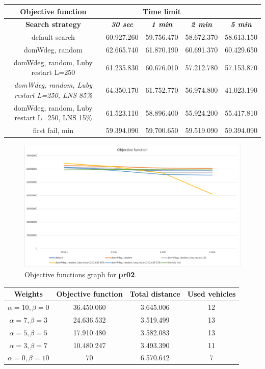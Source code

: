 {
\renewcommand{\arraystretch}{2}
\begin{longtable}[h]{| c | c | c | c | c |}
    \hline
    \textbf{Objective function} & \multicolumn{3}{c}{\textbf{Time limit}} & \\
    \hline
    \textbf{Search strategy} & \textbf{\textit{30 sec}} & \textbf{\textit{1 min}} & \textbf{\textit{2 min}} & \textbf{\textit{5 min}} \\
    \hline
    \endhead
    default search                                         & 60.927.260 & 59.756.470 & 58.672.370 & 58.613.150 \\
    \hline
    domWdeg, random                                        & 62.665.740 & 61.870.190 & 60.691.370 & 60.429.650 \\
    \hline
    domWdeg, random, Luby restart L=250                    & 61.235.830 & 60.676.010 & 57.212.780 & 57.153.870 \\
    \hline
    \textit{domWdeg, random, Luby restart L=250, LNS 85\%} & 64.350.170 & 61.752.770 & 56.974.800 & 41.023.190 \\
    \hline
    domWdeg, random, Luby restart L=250, LNS 15\%          & 61.523.110 & 58.896.400 & 55.924.200 & 55.417.810 \\
    \hline
    first fail, min                                        & 59.394.090 & 59.700.650 & 59.519.090 & 59.394.090 \\
    \hline
\end{longtable}
}
\begin{figure}[H]
    \centering
    \includegraphics[width=0.8\columnwidth]{../graphs/pr02-objf.png}
    \caption{Objective functions graph for \textbf{pr02}.}
\end{figure}
{
\renewcommand{\arraystretch}{2}
\begin{longtable}[h]{| c | c | c | c |}
    \hline
    \textbf{Weights} & \textbf{Objective function} & \textbf{Total distance} & \textbf{Used vehicles} \\
    \hline
    \endhead
    $\alpha = 10, \beta = 0$ & 36.450.060 & 3.645.006 & 12 \\
    \hline
    $\alpha = 7, \beta = 3$  & 24.636.532 & 3.519.499 & 13 \\
    \hline
    $\alpha = 5, \beta = 5$  & 17.910.480 & 3.582.083 & 13 \\
    \hline
    $\alpha = 3, \beta = 7$  & 10.480.247 & 3.493.390 & 11 \\
    \hline
    $\alpha = 0, \beta = 10$ &         70 & 6.570.642 &  7 \\
    \hline
\end{longtable}
}
